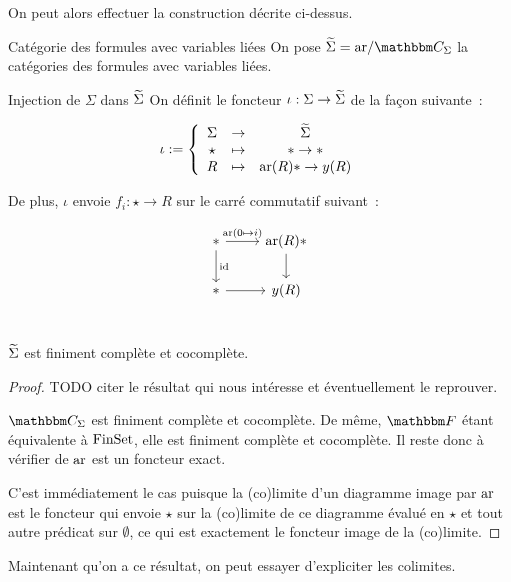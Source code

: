 On peut alors effectuer la construction décrite ci-dessus.

\begin{defi}{Catégorie des formules avec variables liées}
    On pose $\tsigma = \arf/\C_\Sigma$ la catégories des formules avec variables
    liées.
\end{defi}

\begin{defi}{Injection de $\Sigma$ dans $\widetilde{\Sigma}$}
    On définit le foncteur $\iota:\Sigma\rightarrow\widetilde{\Sigma}$ de la façon suivante~:

    \[ \iota := \left\{\begin{array}{ccc}
        \Sigma & \rightarrow & \widetilde{\Sigma} \\
        \star  & \mapsto     & \ast\rightarrow\ast \\
        R      & \mapsto     & \text{ar}(R)\ast\rightarrow y(R) \\
    \end{array}\right. \]

    De plus, $\iota$ envoie $f_i : \star\rightarrow R$ sur le carré commutatif suivant~:

    \[\begin{tikzcd}
        \ast\arrow[d, "\id"]\arrow[r, "\arf(0\mapsto i)"] & \text{ar}(R)\ast\arrow[d] \\
        \ast\arrow[r] & y(R) \\
    \end{tikzcd}\]
\end{defi}

\begin{prop}
    $\widetilde{\Sigma}$ est finiment complète et cocomplète.
\end{prop}

\begin{proof}
    TODO citer le résultat qui nous intéresse et éventuellement le reprouver.

    $\C_\Sigma$ est finiment complète et cocomplète. De même, $\cf$ étant équivalente
    à $\text{FinSet}$, elle est finiment complète et cocomplète. Il reste donc à vérifier de
    $\text{ar}$ est un foncteur exact.

    C'est immédiatement le cas puisque la (co)limite d'un diagramme image par $\text{ar}$ est
    le foncteur qui envoie $\star$ sur la (co)limite de ce diagramme évalué en $\star$
    et tout autre prédicat sur $\emptyset$, ce qui est exactement le foncteur image
    de la (co)limite.
\end{proof}

Maintenant qu'on a ce résultat, on peut essayer d'expliciter les colimites.

